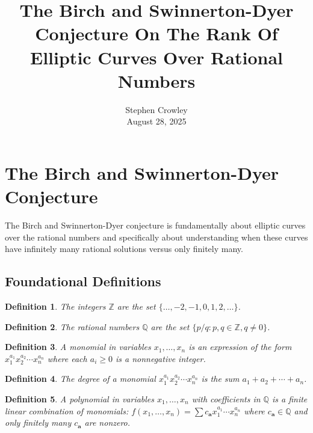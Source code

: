 \documentclass{article}
\newcommand{\tmaffiliation}[1]{\\ #1}
\newtheorem{definition}{Definition}
\begin{document}
\title{The Birch and Swinnerton-Dyer Conjecture On The Rank Of Elliptic Curves
Over Rational Numbers}

\author{
  Stephen Crowley
  \tmaffiliation{August 28, 2025}
}

\maketitle

{\tableofcontents}

\section{The Birch and Swinnerton-Dyer Conjecture}

The Birch and Swinnerton-Dyer conjecture is fundamentally about elliptic
curves over the rational numbers and specifically about understanding when
these curves have infinitely many rational solutions versus only finitely
many.

\subsection{Foundational Definitions}

\begin{definition}
  The integers $\mathbb{Z}$ are the set $\{\ldots, - 2, - 1, 0, 1, 2,
  \ldots\}$.
\end{definition}

\begin{definition}
  The rational numbers $\mathbb{Q}$ are the set $\{p / q : p, q \in
  \mathbb{Z}, q \neq 0\}$.
\end{definition}

\begin{definition}
  A monomial in variables $x_1, \ldots, x_n$ is an expression of the form
  $x_1^{a_1} x_2^{a_2} \cdots x_n^{a_n}$ where each $a_i \geq 0$ is a
  nonnegative integer.
\end{definition}

\begin{definition}
  The degree of a monomial $x_1^{a_1} x_2^{a_2} \cdots x_n^{a_n}$ is the sum
  $a_1 + a_2 + \cdots + a_n$.
\end{definition}

\begin{definition}
  A polynomial in variables $x_1, \ldots, x_n$ with coefficients in
  $\mathbb{Q}$ is a finite linear combination of monomials: $f (x_1, \ldots,
  x_n) = \sum c_{\mathbf{a}} x_1^{a_1} \cdots x_n^{a_n}$ where $c_{\mathbf{a}}
  \in \mathbb{Q}$ and only finitely many $c_{\mathbf{a}}$ are nonzero.
\end{definition}
\end{document}
